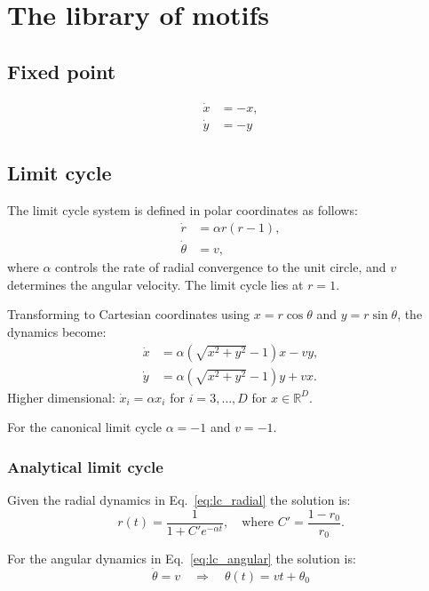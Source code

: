 \documentclass{article}
\theoremstyle{definition} \newtheorem{definition}{Definition}  \newtheorem{example}{Example}
\theoremstyle{remark} \newtheorem{remark}{Remark}
\newcommand{\reals}{\mathbb{R}}
\newcounter{ct}
\begin{document}
\newpage
\section{The library of motifs}
\subsection{Fixed point}
\[
\begin{aligned}
\dot{x} &= -x, \\
\dot{y} &= -y
\end{aligned}
\]


\subsection{Limit cycle}
The limit cycle system is defined in polar coordinates as follows:
\begin{align}%
\dot{r} &= \alpha r(r - 1), \label{eq:lc_radial} \\
\dot{\theta} &= v, \label{eq:lc_angular} %
\end{align}
where \( \alpha \) controls the rate of radial convergence to the unit circle, and \( v \) determines the angular velocity.
The limit cycle lies at \( r = 1 \).

Transforming to Cartesian coordinates using \( x = r \cos\theta \) and \( y = r \sin\theta \), the dynamics become:
\[
\begin{aligned}
\dot{x} &= \alpha \left( \sqrt{x^2 + y^2} - 1 \right) x - v y, \\
\dot{y} &= \alpha \left( \sqrt{x^2 + y^2} - 1 \right) y + v x.
\end{aligned}
\]
Higher dimensional: $\dot x_i = \alpha x_i$ for $i=3, \dots, D$ for $x\in \reals^D$.

For the canonical limit cycle  $\alpha=-1$ and $v=-1$.

%
\subsubsection{Analytical limit cycle}\label{sec:analytical_lc}
Given the radial dynamics in Eq.~\ref{eq:lc_radial} the solution is:
\[
r(t) = \frac{1}{1 + C' e^{-\alpha t}}, \quad \text{where } C' = \frac{1 - r_0}{r_0}.
\]

For the angular dynamics  in Eq.~\ref{eq:lc_angular} the solution is:
\[
\dot{\theta} = v
\quad \Rightarrow \quad 
\theta(t) = vt + \theta_0
\]
\end{document}
